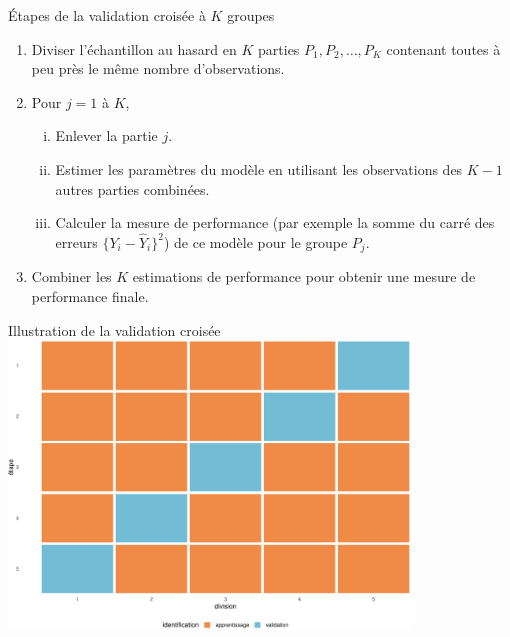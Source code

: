 \documentclass[
  ignorenonframetext,
]{beamer}
\providecommand{\tightlist}{%
  \setlength{\itemsep}{0pt}\setlength{\parskip}{0pt}}\usepackage{longtable,booktabs,array}
\begin{document}
\begin{frame}{Étapes de la validation croisée à \(K\) groupes}
\protect\hypertarget{uxe9tapes-de-la-validation-croisuxe9e-uxe0-k-groupes}{}
\begin{enumerate}
\tightlist
\item
  Diviser l'échantillon au hasard en \(K\) parties
  \(P_1, P_2, \ldots, P_K\) contenant toutes à peu près le même nombre
  d'observations.
\item
  Pour \(j = 1\) à \(K\),

  \begin{enumerate}
  [i.]
  \tightlist
  \item
    Enlever la partie \(j\).
  \item
    Estimer les paramètres du modèle en utilisant les observations des
    \(K-1\) autres parties combinées.
  \item
    Calculer la mesure de performance (par exemple la somme du carré des
    erreurs \(\{Y_i - \widehat{Y}_i\}^2\)) de ce modèle pour le groupe
    \(P_j\).
  \end{enumerate}
\item
  Combiner les \(K\) estimations de performance pour obtenir une mesure
  de performance finale.
\end{enumerate}
\end{frame}

\begin{frame}{Illustration de la validation croisée}
\protect\hypertarget{illustration-de-la-validation-croisuxe9e}{}
\includegraphics[width=0.8\textwidth,height=\textheight]{MATH60602-diapos4_files/figure-beamer/validationcroiseeillust-1.pdf}
\end{frame}
\end{document}
